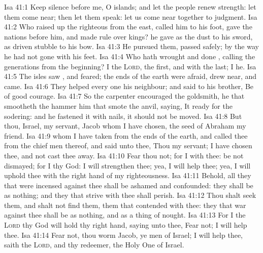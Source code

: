 \vs Isa 41:1 Keep silence before me, O islands; and let the people renew  strength: let them come near; then let them speak: let us come near together to judgment.
\vs Isa 41:2 Who raised up the righteous  from the east, called him to his foot, gave the nations before him, and made  rule over kings? he gave  as the dust to his sword,  as driven stubble to his bow.
\vs Isa 41:3 He pursued them,  passed safely;  by the way  he had not gone with his feet.
\vs Isa 41:4 Who hath wrought and done , calling the generations from the beginning? I the \textsc{Lord}, the first, and with the last; I  he.
\vs Isa 41:5 The isles saw , and feared; the ends of the earth were afraid, drew near, and came.
\vs Isa 41:6 They helped every one his neighbour; and  said to his brother, Be of good courage.
\vs Isa 41:7 So the carpenter encouraged the goldsmith,  he that smootheth  the hammer him that smote the anvil, saying, It  ready for the sodering: and he fastened it with nails,  it should not be moved.
\vs Isa 41:8 But thou, Israel,  my servant, Jacob whom I have chosen, the seed of Abraham my friend.
\vs Isa 41:9  whom I have taken from the ends of the earth, and called thee from the chief men thereof, and said unto thee, Thou  my servant; I have chosen thee, and not cast thee away.
\vs Isa 41:10 Fear thou not; for I  with thee: be not dismayed; for I  thy God: I will strengthen thee; yea, I will help thee; yea, I will uphold thee with the right hand of my righteousness.
\vs Isa 41:11 Behold, all they that were incensed against thee shall be ashamed and confounded: they shall be as nothing; and they that strive with thee shall perish.
\vs Isa 41:12 Thou shalt seek them, and shalt not find them,  them that contended with thee: they that war against thee shall be as nothing, and as a thing of nought.
\vs Isa 41:13 For I the \textsc{Lord} thy God will hold thy right hand, saying unto thee, Fear not; I will help thee.
\vs Isa 41:14 Fear not, thou worm Jacob,  ye men of Israel; I will help thee, saith the \textsc{Lord}, and thy redeemer, the Holy One of Israel.
